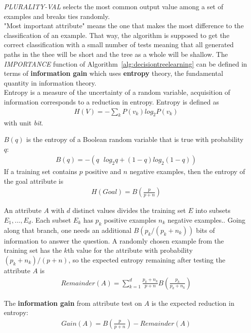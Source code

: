 \documentclass{report}
\begin{document}
{\em PLURALITY-VAL} selects the most common output value among a set of examples and breaks ties randomly.
\\

"Most important attribute" means the one that makes the most difference to the classification of an example. That way, the algorithm is supposed to get the correct classification with a small number of tests meaning that all generated paths in the thee will be short and the tree as a whole will be shallow. The {\em IMPORTANCE} function of Algorithm~\ref{alg:decisiontreelearning} can be defined in terms of {\bf information gain} which uses {\bf entropy} theory, the fundamental quantity in information theory.
\\
Entropy is a measure of the uncertainty of a random variable, acquisition of information corresponds to a reduction in entropy. Entropy is defined as
\begin{align*}
H(V) = -\sum_k P(v_k)log_2 P(v_k)
\end{align*}
with unit {\em bit}.

$B(q)$ is the entropy of a Boolean random variable that is true with probability $q$:
\begin{align*}
B(q) = -(q\mbox{ }log_2 q + (1-q)log_2(1-q))
\end{align*}
If a training set contains $p$ positive and $n$ negative examples, then the entropy of the goal attribute is
\begin{align*}
H(Goal) = B(\frac{p}{p+n})
\end{align*}

An attribute $A$ with $d$ distinct values divides the training set $E$ into subsets $E_1,...,E_d$. Each subset $E_k$ has $p_k$ positive examples $n_k$ negative examples.. Going along that branch, one needs an additional $B(p_k/(p_k+n_k))$ bits of information to answer the question. A randomly chosen example from the training set has the $k$th value for the attribute with probability $(p_k+n_k)/(p+n)$, so the expected entropy remaining after testing the attribute $A$ is
\begin{align*}
Remainder(A) = \sum_{k=1}^{d}\frac{p_k+n_k}{p+n}B(\frac{p_k}{p_k+n_k})
\end{align*}

The {\bf information gain} from attribute test on $A$ is the expected reduction in entropy:
\begin{align*}
Gain(A) = B(\frac{p}{p+n}) - Remainder(A)
\end{align*}
\end{document}
